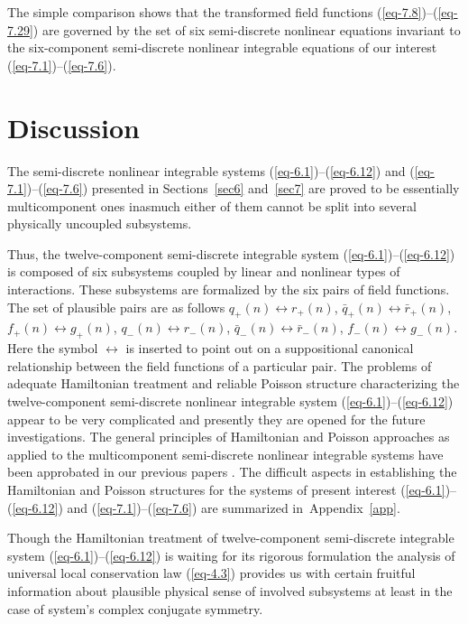 \documentclass[10pt,a4paper]{amsart}
\numberwithin{equation}{section}
\begin{document}
The simple comparison shows that the transformed field functions (\ref{eq-7.8})--(\ref{eq-7.29}) are governed by the set of six semi-discrete nonlinear equations invariant to the six-component semi-discrete nonlinear integrable equations of our interest (\ref{eq-7.1})--(\ref{eq-7.6}).

\section{Discussion}

The semi-discrete nonlinear integrable systems (\ref{eq-6.1})--(\ref{eq-6.12}) and (\ref{eq-7.1})--(\ref{eq-7.6}) presented in Sections~\ref{sec6} and~\ref{sec7} are proved to be essentially multicomponent ones inasmuch either of them cannot be split into several physically uncoupled subsystems.

Thus, the twelve-component semi-discrete integrable system (\ref{eq-6.1})--(\ref{eq-6.12}) is composed of six subsystems coupled by linear and nonlinear types of interactions. These subsystems are formalized by the six pairs of field functions.
The set of plausible pairs are as follows
${q_{+}(n)\leftrightarrow r_{+}(n)}$, $\bar{q}_{+}(n)\leftrightarrow \bar{r}_{+}(n)$, $f_{+}(n)\leftrightarrow g_{+}(n)$, $q_{-}(n)\leftrightarrow r_{-}(n)$, $\bar{q}_{-}(n)\leftrightarrow \bar{r}_{-}(n)$, $f_{-}(n)\leftrightarrow g_{-}(n)$. Here the symbol $\leftrightarrow$ is inserted to point out on a suppositional canonical relationship between the field functions of a particular pair. The problems of adequate Hamiltonian treatment and reliable Poisson structure characterizing the twelve-component semi-discrete nonlinear integrable system (\ref{eq-6.1})--(\ref{eq-6.12})
appear to be very complicated and presently they are opened for the future investigations. The general principles of Hamiltonian and Poisson approaches as applied to the multicomponent semi-discrete nonlinear integrable systems have been approbated in our previous papers \cite{vakhnenko-JMP-56-033505, vakhnenko-JMP-57-113504,vakhnenko-JNMP-24-250, vakhnenko-JMP-59-053504, vakhnenko-LMP-108-1807}. The difficult aspects in establishing the Hamiltonian and Poisson structures for the systems of present interest (\ref{eq-6.1})--(\ref{eq-6.12}) and (\ref{eq-7.1})--(\ref{eq-7.6}) are summarized in~Appendix~\ref{app}.

Though the Hamiltonian treatment of twelve-component semi-discrete integrable system (\ref{eq-6.1})--(\ref{eq-6.12}) is waiting for its rigorous formulation the analysis of universal local conservation law (\ref{eq-4.3}) provides us with certain fruitful information about plausible physical sense of involved subsystems at least in the case of system's complex conjugate symmetry.
\end{document}
